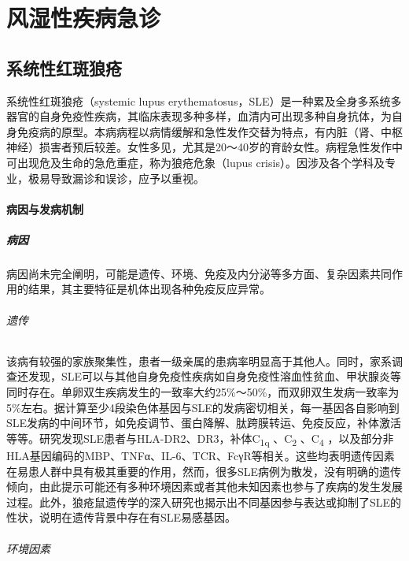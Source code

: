 \part{风湿性疾病急诊}

\chapter{系统性红斑狼疮}

系统性红斑狼疮（systemic lupus
erythematosus，SLE）是一种累及全身多系统多器官的自身免疫性疾病，其临床表现多种多样，血清内可出现多种自身抗体，为自身免疫病的原型。本病病程以病情缓解和急性发作交替为特点，有内脏（肾、中枢神经）损害者预后较差。女性多见，尤其是20～40岁的育龄女性。病程急性发作中可出现危及生命的急危重症，称为狼疮危象（lupus
crisis）。因涉及各个学科及专业，极易导致漏诊和误诊，应予以重视。

\subsection{病因与发病机制}

\subsubsection{病因}

病因尚未完全阐明，可能是遗传、环境、免疫及内分泌等多方面、复杂因素共同作用的结果，其主要特征是机体出现各种免疫反应异常。

\paragraph{遗传}

该病有较强的家族聚集性，患者一级亲属的患病率明显高于其他人。同时，家系调查还发现，SLE可以与其他自身免疫性疾病如自身免疫性溶血性贫血、甲状腺炎等同时存在。单卵双生疾病发生的一致率大约25\%～50\%，而双卵双生发病一致率为5\%左右。据计算至少4段染色体基因与SLE的发病密切相关，每一基因各自影响到SLE发病的中间环节，如免疫调节、蛋白降解、肽跨膜转运、免疫反应，补体激活等等。研究发现SLE患者与HLA-DR2、DR3，补体C\textsubscript{1q}
、C\textsubscript{2} 、C\textsubscript{4}
，以及部分非HLA基因编码的MBP、TNFα、IL-6、TCR、FcγR等相关。这些均表明遗传因素在易患人群中具有极其重要的作用，然而，很多SLE病例为散发，没有明确的遗传倾向，由此提示可能还有多种环境因素或者其他未知因素也参与了疾病的发生发展过程。此外，狼疮鼠遗传学的深入研究也揭示出不同基因参与表达或抑制了SLE的性状，说明在遗传背景中存在有SLE易感基因。

\paragraph{环境因素}

